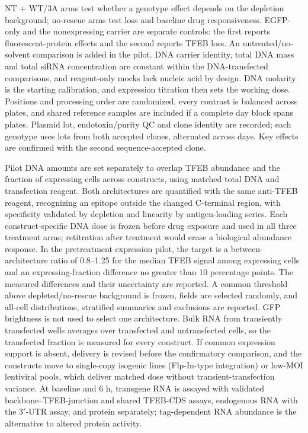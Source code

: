 NT + WT/3A arms test whether a genotype effect depends on the depletion background; no-rescue arms test loss and baseline drug responsiveness. EGFP-only and the nonexpressing carrier are separate controls: the first reports fluorescent-protein effects and the second reports TFEB loss. An untreated/no-solvent comparison is added in the pilot. DNA carrier identity, total DNA mass and total siRNA concentration are constant within the DNA-transfected comparisons, and reagent-only mocks lack nucleic acid by design. DNA molarity is the starting calibration, and expression titration then sets the working dose. Positions and processing order are randomized, every contrast is balanced across plates, and shared reference samples are included if a complete day block spans plates. Plasmid lot, endotoxin/purity QC and clone identity are recorded; each genotype uses lots from both accepted clones, alternated across days. Key effects are confirmed with the second sequence-accepted clone.

Pilot DNA amounts are set separately to overlap TFEB abundance and the fraction of expressing cells across constructs, using matched total DNA and transfection reagent. Both architectures are quantified with the same anti-TFEB reagent, recognizing an epitope outside the changed C-terminal region, with specificity validated by depletion and linearity by antigen-loading series. Each construct-specific DNA dose is frozen before drug exposure and used in all three treatment arms; retitration after treatment would erase a biological abundance response. In the pretreatment expression pilot, the target is a between-architecture ratio of 0.8--1.25 for the median TFEB signal among expressing cells and an expressing-fraction difference no greater than 10 percentage points. The measured differences and their uncertainty are reported. A common threshold above depleted/no-rescue background is frozen, fields are selected randomly, and all-cell distributions, stratified summaries and exclusions are reported. GFP brightness is not used to select one architecture. Bulk RNA from transiently transfected wells averages over transfected and untransfected cells, so the transfected fraction is measured for every construct. If common expression support is absent, delivery is revised before the confirmatory comparison, and the constructs move to single-copy isogenic lines (Flp-In-type integration) or low-MOI lentiviral pools, which deliver matched dose without transient-transfection variance. At baseline and 6 h, transgene RNA is assayed with validated backbone--TFEB-junction and shared TFEB-CDS assays, endogenous RNA with the 3$'$-UTR assay, and protein separately; tag-dependent RNA abundance is the alternative to altered protein activity.

